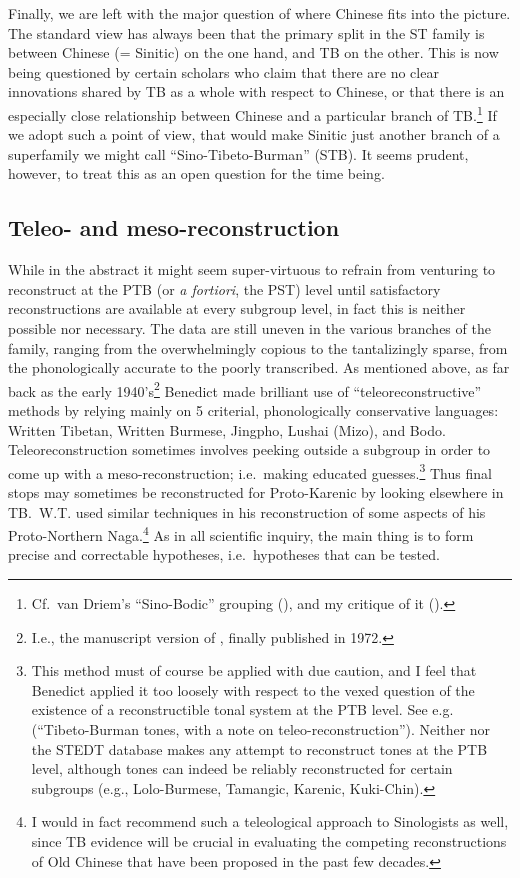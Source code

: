 Finally, we are left with the major question of where Chinese fits into the picture. The standard view has always been that the primary split in the ST family is between Chinese (= Sinitic) on the one hand, and TB on the other. This is now being questioned by certain scholars who claim that there are no clear innovations shared by TB as a whole with respect to Chinese, or that there is an especially close relationship between Chinese and a particular branch of TB.\footnote{Cf.\ van Driem’s “Sino-Bodic” grouping (\citealt{SVD-SB}), and my critique of it (\citealt{JAM-OSB}).} If we adopt such a point of view, that would make Sinitic just another branch of a superfamily we might call “Sino-Tibeto-Burman” (STB). It seems prudent, however, to treat this as an open question for the time being.


\subsection{Teleo- and meso-reconstruction}

While in the abstract it might seem super-virtuous to refrain from venturing to reconstruct at the PTB (or {\it a fortiori}, the PST) level until satisfactory reconstructions are available at every subgroup level, in fact this is neither possible nor necessary. The data are still uneven in the various branches of the family, ranging from the overwhelmingly copious to the tantalizingly sparse, from the phonologically accurate to the poorly transcribed. As mentioned above, as far back as the early 1940’s\footnote{I.e., the manuscript version of \textit{}, finally published in 1972.} Benedict made brilliant use of “teleoreconstructive” methods by relying mainly on 5 criterial, phonologically conservative languages: Written Tibetan, Written Burmese, Jingpho, Lushai (Mizo), and Bodo. Teleoreconstruction sometimes involves peeking outside a subgroup in order to come up with a meso-reconstruction; i.e.\ making educated guesses.\footnote{This method must of course be applied with due caution, and I feel that Benedict applied it too loosely with respect to the vexed question of the existence of a reconstructible tonal system at the PTB level. See e.g.\ \citealt{PKB-TBT} (“Tibeto-Burman tones, with a note on teleo-reconstruction”). Neither \textit{} nor the STEDT database makes any attempt to reconstruct tones at the PTB level, although tones can indeed be reliably reconstructed for certain subgroups (e.g., Lolo-Burmese, Tamangic, Karenic, Kuki-Chin).} Thus final stops may sometimes be reconstructed for Proto-Karenic by looking elsewhere in TB.\ W.T. \citet{WTF-PNN} used similar techniques in his reconstruction of some aspects of his Proto-Northern Naga.\footnote{I would in fact recommend such a teleological approach to Sinologists as well, since TB evidence will be crucial in evaluating the competing reconstructions of Old Chinese that have been proposed in the past few decades.} As in all scientific inquiry, the main thing is to form precise and correctable hypotheses, i.e.\ hypotheses that can be tested.

